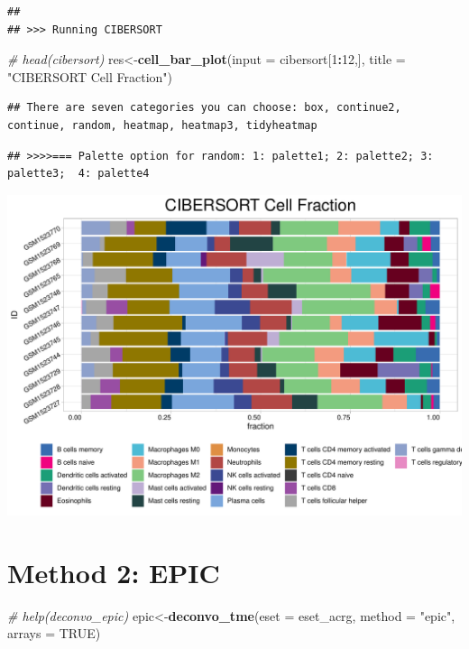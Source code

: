\documentclass[
  12pt,
]{book}
\newenvironment{Shaded}{\begin{snugshade}}{\end{snugshade}}
\newcommand{\AttributeTok}[1]{\textcolor[rgb]{0.13,0.29,0.53}{#1}}
\newcommand{\CommentTok}[1]{\textcolor[rgb]{0.56,0.35,0.01}{\textit{#1}}}
\newcommand{\ConstantTok}[1]{\textcolor[rgb]{0.56,0.35,0.01}{#1}}
\newcommand{\DecValTok}[1]{\textcolor[rgb]{0.00,0.00,0.81}{#1}}
\newcommand{\FunctionTok}[1]{\textcolor[rgb]{0.13,0.29,0.53}{\textbf{#1}}}
\newcommand{\NormalTok}[1]{#1}
\newcommand{\OtherTok}[1]{\textcolor[rgb]{0.56,0.35,0.01}{#1}}
\newcommand{\SpecialCharTok}[1]{\textcolor[rgb]{0.81,0.36,0.00}{\textbf{#1}}}
\newcommand{\StringTok}[1]{\textcolor[rgb]{0.31,0.60,0.02}{#1}}
\theoremstyle{definition}
\theoremstyle{definition}
\theoremstyle{definition}
\theoremstyle{definition}
\theoremstyle{remark}
\begin{document}
\begin{verbatim}
## 
## >>> Running CIBERSORT
\end{verbatim}

\begin{Shaded}
\begin{Highlighting}[]
\CommentTok{\# head(cibersort)}
\NormalTok{res}\OtherTok{\textless{}{-}}\FunctionTok{cell\_bar\_plot}\NormalTok{(}\AttributeTok{input =}\NormalTok{ cibersort[}\DecValTok{1}\SpecialCharTok{:}\DecValTok{12}\NormalTok{,], }\AttributeTok{title =} \StringTok{"CIBERSORT Cell Fraction"}\NormalTok{)}
\end{Highlighting}
\end{Shaded}

\begin{verbatim}
## There are seven categories you can choose: box, continue2, continue, random, heatmap, heatmap3, tidyheatmap
\end{verbatim}

\begin{verbatim}
## >>>>=== Palette option for random: 1: palette1; 2: palette2; 3: palette3;  4: palette4
\end{verbatim}

\includegraphics{_main_files/figure-latex/unnamed-chunk-63-1.pdf}

\hypertarget{method-2-epic}{%
\section{Method 2: EPIC}\label{method-2-epic}}

\begin{Shaded}
\begin{Highlighting}[]
\CommentTok{\# help(deconvo\_epic)}
\NormalTok{epic}\OtherTok{\textless{}{-}}\FunctionTok{deconvo\_tme}\NormalTok{(}\AttributeTok{eset =}\NormalTok{ eset\_acrg, }\AttributeTok{method =} \StringTok{"epic"}\NormalTok{, }\AttributeTok{arrays =} \ConstantTok{TRUE}\NormalTok{)}
\end{Highlighting}
\end{Shaded}
\end{document}
